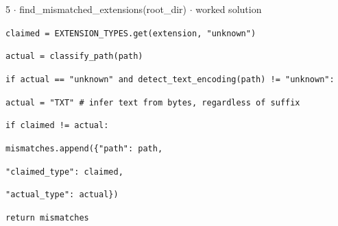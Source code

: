 \documentclass[11pt]{article}
\begin{document}
\begin{keepsection}
\begin{workedbox}{5 \ensuremath{\cdot} find\_mismatched\_extensions(root\_dir) \ensuremath{\cdot} worked solution}
\begin{enumerate}
\begin{tcolorbox}[colback=Paperblue,colframe=Paperblue,boxrule=0pt,arc=0pt,left=7pt,right=7pt,top=5pt,bottom=5pt]
\noindent\hspace*{5em}\texttt{claimed = EXTENSION\_TYPES.get(extension, "unknown")}\par
\noindent\hspace*{5em}\texttt{actual = classify\_path(path)}\par
\noindent\hspace*{5em}\texttt{if actual == "unknown" and detect\_text\_encoding(path) != "unknown":}\par
\noindent\hspace*{7em}\texttt{actual = "TXT" \# infer text from bytes, regardless of suffix}\par
\noindent\hspace*{5em}\texttt{if claimed != actual:}\par
\noindent\hspace*{7em}\texttt{mismatches.append(\{"path": path,}\par
\noindent\hspace*{15em}\texttt{"claimed\_type": claimed,}\par
\noindent\hspace*{15em}\texttt{"actual\_type": actual\})}\par
\noindent\hspace*{1em}\texttt{return mismatches}\par
\end{tcolorbox}
\end{enumerate}
\end{workedbox}

\end{keepsection}
\end{document}
